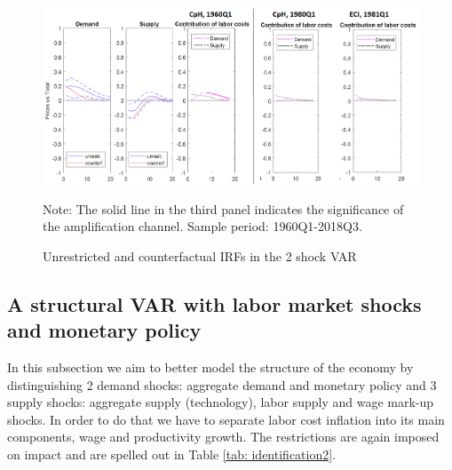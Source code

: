\documentclass[11pt]{article}
\begin{document}
\begin{figure}[!h]
\begin{center}
\caption{Unrestricted and counterfactual IRFs in the 2
shock VAR}\label{fig:2ShockVAR_Counter}
\includegraphics[scale=0.4]{US_2shockVAR_Counter_all.png}
\begin{minipage}{\textwidth} {\footnotesize
Note: The solid line in the third panel indicates the significance of the amplification channel.
Sample period: 1960Q1-2018Q3.\par}
\end{minipage}
\end{center}
\end{figure}


\subsection{A structural VAR with  labor market shocks and monetary policy}
In this subsection we aim to better model the structure of the economy by distinguishing 2 demand shocks: aggregate demand and monetary policy and 3 supply shocks: aggregate supply (technology), labor supply and wage mark-up shocks. In order to do that we have to separate labor cost inflation into its main components, wage and productivity growth. The restrictions are again imposed on impact and are spelled out in Table \ref{tab: identification2}. 
\end{document}
